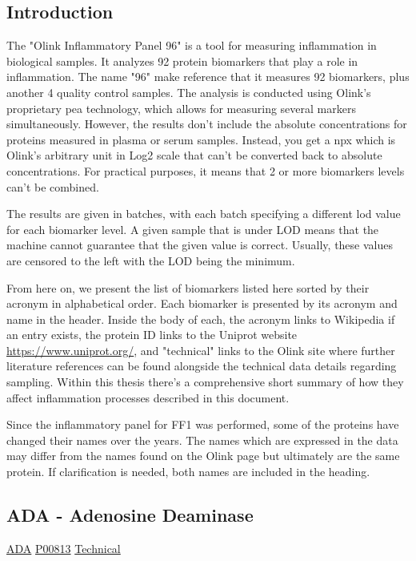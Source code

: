 \subsection{Introduction}

The "Olink Inflammatory Panel 96" is a tool for measuring inflammation in biological samples. It analyzes 92 protein biomarkers that play a role in inflammation. The name "96" make reference that it measures 92 biomarkers, plus another 4 quality control samples. The analysis is conducted using Olink's proprietary \gls{pea} technology, which allows for measuring several markers simultaneously. However, the results don't include the absolute concentrations for proteins measured in plasma or serum samples. Instead, you get a \gls{npx} which is Olink’s arbitrary unit in Log2 scale that can't be converted back to absolute concentrations. For practical purposes, it means that 2 or more biomarkers levels can't be combined. 

The results are given in batches, with each batch specifying a different \gls{lod} value for each biomarker level. A given sample that is under LOD means that the machine cannot guarantee that the given value is correct. Usually, these values are censored to the left with the LOD being the minimum.

From here on, we present the list of biomarkers listed here sorted by their acronym in alphabetical order. Each biomarker is presented by its acronym and name in the header. Inside the body of each, the acronym links to Wikipedia if an entry exists, the protein ID links to the Uniprot website \url{https://www.uniprot.org/}, and "technical" links to the Olink site where further literature references can be found alongside the technical data details regarding sampling. Within this thesis there's a comprehensive short summary of how they affect inflammation processes described in this document.

Since the inflammatory panel for FF1 was performed, some of the proteins have changed their names over the years. The names which are expressed in the data may differ from the names found on the Olink page but ultimately are the same protein. If clarification is needed, both names are included in the heading.

\subsection{ADA - Adenosine Deaminase}

\href{https://en.wikipedia.org/wiki/Adenosine\_deaminase}{ADA} \href{http://www.uniprot.org/uniprot/P00813}{P00813}
\href{https://olink.com/products-services/target/protein/?assayID=5112}{Technical}

